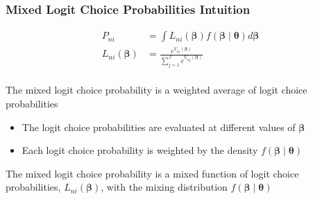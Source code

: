 \documentclass{beamer}\usepackage[]{graphicx}\usepackage[]{color}
\begin{document}
\begin{frame}\frametitle{Mixed Logit Choice Probabilities Intuition}
	\begin{align*}
        P_{ni} & = \int L_{ni}(\bm{\beta}) f(\bm{\beta} \mid \bm{\theta}) d \bm{\beta} \\
        L_{ni}(\bm{\beta}) & = \frac{e^{V_{ni}(\bm{\beta})}}{\sum_{j = 1}^J e^{V_{nj}(\bm{\beta})}}
    \end{align*} \\
	\vspace{3ex}
	The mixed logit choice probability is a weighted average of logit choice probabilities
	\begin{itemize}
		\item The logit choice probabilities are evaluated at different values of $\bm{\beta}$
		\item Each logit choice probability is weighted by the density $f(\bm{\beta} \mid \bm{\theta})$
	\end{itemize}
	\vspace{3ex}
	The mixed logit choice probability is a mixed function of logit choice probabilities, $L_{ni}(\bm{\beta})$, with the mixing distribution $f(\bm{\beta} \mid \bm{\theta})$
\end{frame}
\end{document}
